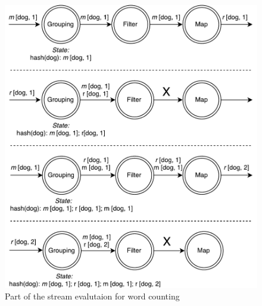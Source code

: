 \begin{figure}[htb]
  \centering
  \includegraphics[scale=0.5]{pics/wordcount}
  \caption{Part of the stream evalutaion for word counting}
  \label {word-count-figure}
\end{figure}

